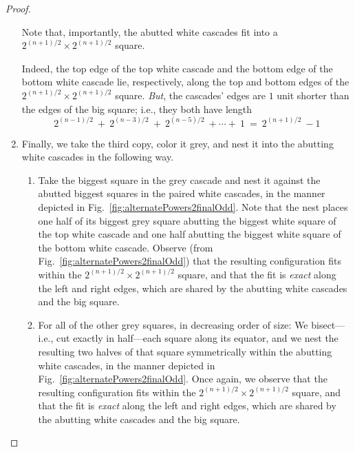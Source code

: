 \begin{proof}
\begin{enumerate}
Note that, importantly, the abutted white cascades fit into a $2^{(n+1)/2} \times 2^{(n+1)/2}$ square.

\bigskip

\noindent {}

\bigskip

Indeed, the top edge of the top white cascade and the bottom edge of the bottom white cascade lie, respectively, along the top and bottom edges of the $2^{(n+1)/2} \times 2^{(n+1)/2}$ square.  {\em But}, the cascades' edges are $1$ unit shorter than the edges of the big square; i.e., they both have length
\[
2^{(n-1)/2} \ + \ 2^{(n-3)/2} \ + \ 2^{(n-5)/2} \ + \cdots + \ 1
\ = \ 2^{(n+1)/2} \ - 1
\]

\item
Finally, we take the third copy, color it grey, and nest it into the abutting white cascades in the following way.
  \begin{enumerate}
  \item
Take the biggest square in the grey cascade and nest it against the abutted biggest squares in the paired white cascades, in the manner depicted in Fig.~\ref{fig:alternatePowers2finalOdd}.  Note that the nest places one half of its biggest grey square abutting the biggest white square of the top white cascade and one half abutting the biggest white square of the bottom white cascade.  Observe (from Fig.~\ref{fig:alternatePowers2finalOdd}) that the resulting configuration fits within the $2^{(n+1)/2} \times 2^{(n+1)/2}$ square, and that the fit is {\em exact} along the left and right edges, which are shared by the abutting white cascades and the big square.

  \item
For all of the other grey squares, in decreasing order of size: We bisect---i.e., cut exactly in half---each square along its equator, and we nest the resulting two halves of that square symmetrically within the abutting white cascades, in the manner depicted in Fig.~\ref{fig:alternatePowers2finalOdd}.  Once again, we observe that the resulting configuration fits within the $2^{(n+1)/2} \times 2^{(n+1)/2}$ square, and that the fit is {\em exact} along the
left and right edges, which are shared by the abutting white cascades and the big square.


\end{enumerate}
\end{enumerate}
\end{proof}

